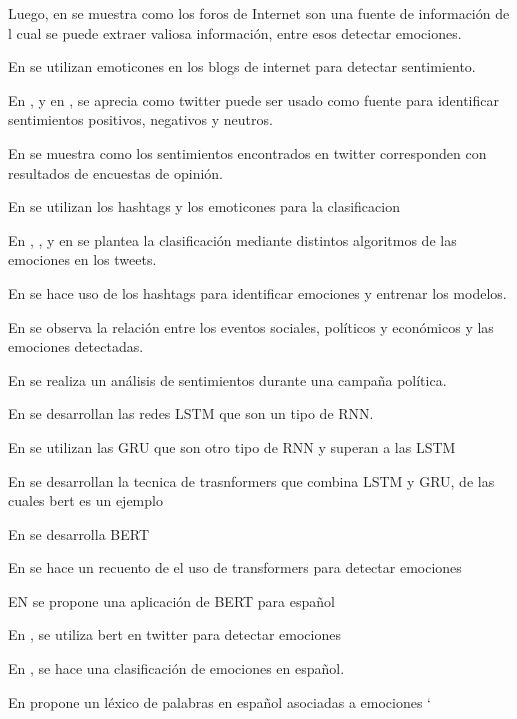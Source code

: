Luego, en \cite{pang2008opinion} se muestra como los foros de Internet son una fuente de información de l cual se puede extraer valiosa información, entre esos detectar emociones.

En \cite{read2005using} se utilizan emoticones en los blogs de internet para detectar sentimiento.

En \cite{pak2010twitter}, \cite{kouloumpis2011twitter} y en \cite{go2009twitter}, \cite{barbosa2010robust} se aprecia como twitter puede ser usado como fuente para identificar sentimientos positivos, negativos y neutros.

En \cite{o2010tweets} se muestra como los sentimientos encontrados en twitter corresponden con resultados de encuestas de opinión.

En \cite{davidov2010enhanced} se utilizan los hashtags y los emoticones para la clasificacion


En \cite{hasan2014emotex}, , \cite{wang2012harnessing}y en \cite{roberts2012empatweet} se plantea la clasificación mediante distintos algoritmos de las emociones en los tweets.

En \cite{mohammad2012emotional} se hace uso de los hashtags para identificar emociones y entrenar los modelos.

En \cite{bollen2011modeling} se observa la relación entre los eventos sociales, políticos y económicos y las emociones detectadas.

En \cite{tumasjan2010predicting} se realiza un análisis de sentimientos durante una campaña política.

En \cite{hochreiter1997long} se desarrollan las redes LSTM que son un tipo de RNN.

En \cite{chung2014empirical} se utilizan las GRU que son otro tipo de RNN y superan a las LSTM

En \cite{vaswani2017attention} se desarrollan la tecnica de trasnformers que combina LSTM y GRU, de las cuales bert es un ejemplo

En \cite{devlin2018bert} se desarrolla BERT

En \cite{acheampong2021transformer} se hace un recuento de el uso de transformers para detectar emociones

EN \cite{canete2020spanish} se propone una aplicación de BERT para español

En \cite{gonzalez2021twilbert}, \cite{huang2019ana} se utiliza bert en twitter para  detectar emociones

En \cite{plaza2020improved}, \cite{gil2013combining} se hace una clasificación de emociones en español.


En \cite{sidorov2012empirical} propone un léxico de palabras en español asociadas a emociones
`








